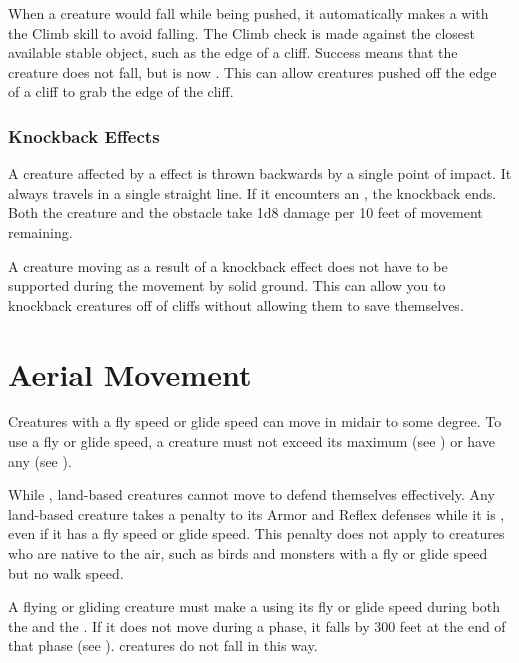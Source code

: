       When a creature would fall while being pushed, it automatically makes a  with the Climb skill to avoid falling.
      The Climb check is made against the closest available stable object, such as the edge of a cliff.
      Success means that the creature does not fall, but is now \climbing.
      This can allow creatures pushed off the edge of a cliff to grab the edge of the cliff.

    \subsubsection{Knockback Effects}\label{Knockback Effects}
      A creature affected by a  effect is thrown backwards by a single point of impact.
      It always travels in a single straight line.
      If it encounters an , the knockback ends.
      Both the creature and the obstacle take 1d8 damage per 10 feet of movement remaining.

      A creature moving as a result of a knockback effect does not have to be supported during the movement by solid ground.
      This can allow you to knockback creatures off of cliffs without allowing them to save themselves.

\section{Aerial Movement}\label{Aerial Movement}
  Creatures with a fly speed or glide speed can move in midair to some degree.
  To use a fly or glide speed, a creature must not exceed its maximum  (see ) or have any  (see ).

  While , land-based creatures cannot move to defend themselves effectively.
  Any land-based creature takes a  penalty to its Armor and Reflex defenses while it is , even if it has a fly speed or glide speed.
  This penalty does not apply to creatures who are native to the air, such as birds and monsters with a fly or glide speed but no walk speed.

  A flying or gliding creature must make a  using its fly or glide speed during both the  and the .
  If it does not move during a phase, it falls by 300 feet at the end of that phase (see ).
   creatures do not fall in this way.

